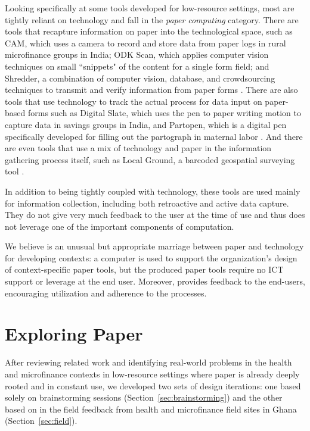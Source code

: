 \documentclass{sig-alternate}
\begin{document}
Looking specifically at some tools developed for low-resource settings, most are tightly reliant on technology and fall in the \emph{paper computing} category. There are tools that recapture information on paper into the technological space, such as CAM, which uses a camera to record and store data from paper logs in rural microfinance groups in India; ODK Scan, which applies computer vision techniques on small ``snippets" of the content for a single form field; and Shredder, a combination of computer vision, database, and crowdsourcing techniques to transmit and verify information from paper forms \cite{parikh2006, akona2009, dell2012, dell2013, chen2012}. There are also tools that use technology to track the actual process for data input on paper-based forms such as Digital Slate, which uses the pen to paper writing motion to capture data in savings groups in India, and Partopen, which is a digital pen specifically developed for filling out the partograph in maternal labor \cite{ratan2010, underwood2012, underwood2013}. And there are even tools that use a mix of technology and paper in the information gathering process itself, such as Local Ground, a barcoded geospatial surveying tool \cite{wart2010}.

In addition to being tightly coupled with technology, these tools are used mainly for information collection, including both retroactive and active data capture. They do not give very much feedback to the user at the time of use and thus does not leverage one of the important components of computation.

We believe \nifty is an unusual but appropriate marriage between paper and technology for developing contexts: a computer is used to support the organization's design of context-specific paper tools, but the produced paper tools require no ICT support or leverage at the end user. Moreover, \nifty provides feedback to the end-users, encouraging utilization and adherence to the processes.


\section{Exploring Paper}
\label{sec:exploring-paper}

After reviewing related work and identifying real-world problems in the health and microfinance contexts in low-resource settings where paper is already deeply rooted and in constant use, we developed two sets of design iterations: one based solely on brainstorming sessions (Section~\ref{sec:brainstorming}) and the other based on in the field feedback from health and microfinance field sites in Ghana (Section~\ref{sec:field}). 
\end{document}
